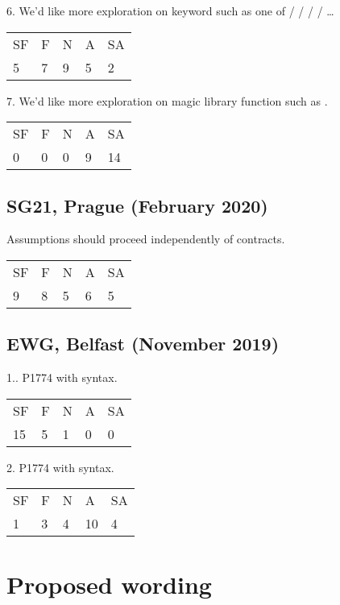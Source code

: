 6. We’d like more exploration on keyword such as one of  /  /  /  / …

\hspace{6mm}
\begin{tabular}{lllll}
SF & F & N & A & SA \\
5 & 7 & 9 & 5 & 2
\end{tabular}

7. We’d like more exploration on magic library function such as .

\hspace{6mm}
\begin{tabular}{lllll}
SF & F & N & A & SA \\
0 & 0 & 0 & 9 & 14
\end{tabular}

\subsection{SG21, Prague (February 2020)}

Assumptions should proceed independently of contracts.

\hspace{6mm}
\begin{tabular}{lllll}
SF & F & N & A & SA \\
9 & 8 & 5 & 6 & 5
\end{tabular}


\subsection{EWG, Belfast (November 2019)}

1.. P1774 with  syntax.

\hspace{6mm}
\begin{tabular}{lllll}
SF & F & N & A & SA \\
15 & 5 & 1 & 0 & 0
\end{tabular}

2. P1774 with  syntax.

\hspace{6mm}
\begin{tabular}{lllll}
SF & F & N & A & SA \\
1 & 3 & 4 & 10 & 4
\end{tabular}

\section{Proposed wording}

